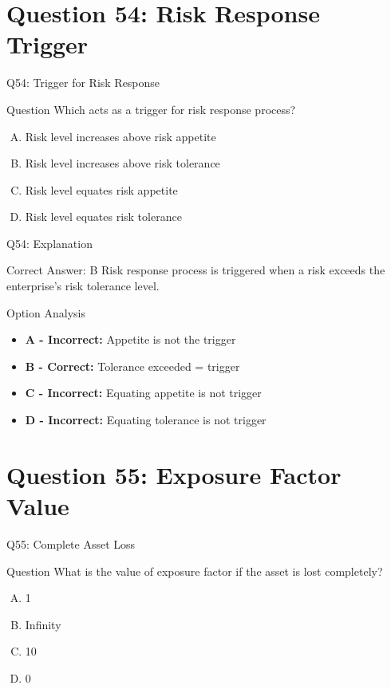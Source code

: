 \documentclass{beamer}
\begin{document}
	\section{Question 54: Risk Response Trigger}
	
	\begin{frame}{Q54: Trigger for Risk Response}
		\begin{block}{Question}
			Which acts as a trigger for risk response process?
		\end{block}
		\begin{enumerate}[(A)]
			\item Risk level increases above risk appetite
			\item Risk level increases above risk tolerance
			\item Risk level equates risk appetite
			\item Risk level equates risk tolerance
		\end{enumerate}
	\end{frame}
	
	\begin{frame}{Q54: Explanation}
		\begin{block}{Correct Answer: B}
			Risk response process is triggered when a risk exceeds the enterprise's risk tolerance level.
		\end{block}
		\begin{block}{Option Analysis}
			\begin{itemize}
				\item \textbf{A - Incorrect:} Appetite is not the trigger
				\item \textbf{B - Correct:} Tolerance exceeded = trigger
				\item \textbf{C - Incorrect:} Equating appetite is not trigger
				\item \textbf{D - Incorrect:} Equating tolerance is not trigger
			\end{itemize}
		\end{block}
	\end{frame}
	
	\section{Question 55: Exposure Factor Value}
	
	\begin{frame}{Q55: Complete Asset Loss}
		\begin{block}{Question}
			What is the value of exposure factor if the asset is lost completely?
		\end{block}
		\begin{enumerate}[(A)]
			\item 1
			\item Infinity
			\item 10
			\item 0
		\end{enumerate}
	\end{frame}
	
\end{document}
